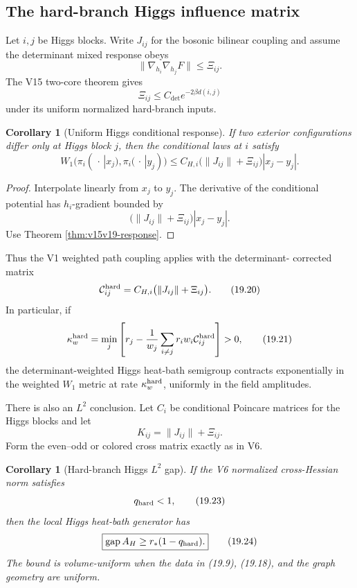 \documentclass[11pt]{article}
\newtheorem{corollary}[theorem]{Corollary}
\theoremstyle{remark}
\begin{document}
\subsection{The hard-branch Higgs influence matrix}

Let \(i,j\) be Higgs blocks.  Write \(J_{ij}\) for the bosonic
bilinear coupling and assume the determinant mixed response obeys
\[
 \|\nabla_{h_i}\nabla_{h_j}F\|
 \le\Xi_{ij}.                                               \tag{19.17}
\]
The V15 two-core theorem gives
\[
 \Xi_{ij}\le C_{\det}e^{-2\beta d(i,j)}                     \tag{19.18}
\]
under its uniform normalized hard-branch inputs.

\begin{corollary}[Uniform Higgs conditional response]
\label{cor:v15v19-influence}
If two exterior configurations differ only at Higgs block \(j\),
then the conditional laws at \(i\) satisfy
\[
 \boxed{
 W_1\bigl(\pi_i(\,\cdot\,|x_j),\pi_i(\,\cdot\,|y_j)\bigr)
 \le
 C_{H,i}
 \bigl(\|J_{ij}\|+\Xi_{ij}\bigr)|x_j-y_j|.}                 \tag{19.19}
\]
\end{corollary}

\begin{proof}
Interpolate linearly from \(x_j\) to \(y_j\).  The derivative of
the conditional potential has \(h_i\)-gradient bounded by
\[
 \bigl(\|J_{ij}\|+\Xi_{ij}\bigr)|x_j-y_j|.
\]
Use Theorem \ref{thm:v15v19-response}.
\end{proof}

Thus the V1 weighted path coupling applies with the determinant-
corrected matrix
\[
 {\cal C}^{\rm hard}_{ij}
 =
 C_{H,i}\bigl(\|J_{ij}\|+\Xi_{ij}\bigr).                   \tag{19.20}
\]
In particular, if
\[
 \kappa_w^{\rm hard}
 =
 \min_j\left[
 r_j-\frac1{w_j}
 \sum_{i\ne j}r_iw_i{\cal C}^{\rm hard}_{ij}
 \right]>0,                                                 \tag{19.21}
\]
the determinant-weighted Higgs heat-bath semigroup contracts
exponentially in the weighted \(W_1\) metric at rate
\(\kappa_w^{\rm hard}\), uniformly in the field amplitudes.

There is also an \(L^2\) conclusion.  Let \(C_i\) be conditional
Poincare matrices for the Higgs blocks and let
\[
 K_{ij}=\|J_{ij}\|+\Xi_{ij}.                                \tag{19.22}
\]
Form the even--odd or colored cross matrix exactly as in V6.

\begin{corollary}[Hard-branch Higgs \(L^2\) gap]
\label{cor:v15v19-gap}
If the V6 normalized cross-Hessian norm satisfies
\[
 q_{\rm hard}<1,                                            \tag{19.23}
\]
then the local Higgs heat-bath generator has
\[
 \boxed{
 \operatorname{gap}A_H
 \ge r_*(1-q_{\rm hard}).}                                 \tag{19.24}
\]
The bound is volume-uniform when the data in
(19.9), (19.18), and the graph geometry are uniform.
\end{corollary}
\end{document}
